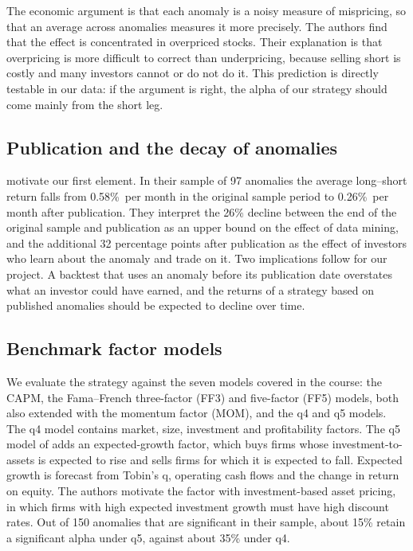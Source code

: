 \documentclass[12pt,a4paper]{article}
\newcommand{\pmo}{\%~per month}
\begin{document}
The economic argument is that each anomaly is a noisy measure of mispricing, so that an average across anomalies measures it more precisely. The authors find that the effect is concentrated in overpriced stocks. Their explanation is that overpricing is more difficult to correct than underpricing, because selling short is costly and many investors cannot or do not do it. This prediction is directly testable in our data: if the argument is right, the alpha of our strategy should come mainly from the short leg.

\subsection{Publication and the decay of anomalies}
\citet{mclean2016} motivate our first element. In their sample of 97 anomalies the average long--short return falls from 0.58\pmo{} in the original sample period to 0.26\pmo{} after publication. They interpret the 26\% decline between the end of the original sample and publication as an upper bound on the effect of data mining, and the additional 32 percentage points after publication as the effect of investors who learn about the anomaly and trade on it. Two implications follow for our project. A backtest that uses an anomaly before its publication date overstates what an investor could have earned, and the returns of a strategy based on published anomalies should be expected to decline over time.

\subsection{Benchmark factor models}
We evaluate the strategy against the seven models covered in the course: the CAPM, the Fama--French three-factor (FF3) and five-factor (FF5) models, both also extended with the momentum factor (MOM), and the q4 and q5 models. The q4 model contains market, size, investment and profitability factors. The q5 model of \citet{hou2021} adds an expected-growth factor, which buys firms whose investment-to-assets is expected to rise and sells firms for which it is expected to fall. Expected growth is forecast from Tobin's q, operating cash flows and the change in return on equity. The authors motivate the factor with investment-based asset pricing, in which firms with high expected investment growth must have high discount rates. Out of 150 anomalies that are significant in their sample, about 15\% retain a significant alpha under q5, against about 35\% under q4.
\end{document}
